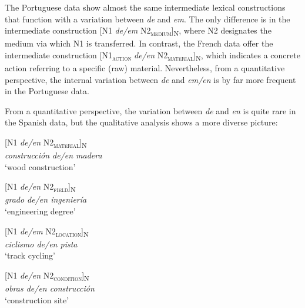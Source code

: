 \documentclass[output=paper]{langsci/langscibook}
\begin{document}
The Portuguese data show almost the same intermediate lexical constructions that function with a variation between \textit{de} and \textit{em}. The only difference is in the intermediate construction [N1 \textit{de/em} N2\textsubscript{\scshape medium}]\textsubscript{N}, where N2 designates the medium via which N1 is transferred. In contrast, the French data offer the intermediate construction [N1\textsubscript{\scshape action} \textit{de/en} N2\textsubscript{\scshape material}]\textsubscript{N}, which indicates a concrete action referring to a specific (raw) material. Nevertheless, from a quantitative perspective, the internal variation between \textit{de} and \textit{em/en} is by far more frequent in the Portuguese data.

From a quantitative perspective, the variation between \textit{de} and \textit{en} is quite rare in the Spanish data, but the qualitative analysis shows a more diverse picture:

\begin{exe}\ex\begin{minipage}[t]{0.4\textwidth}    %
[N1 \textit{de/en} N2\textsubscript{\scshape material}]\textsubscript{N}\\
\textit{construcción de/en madera }\\
`wood construction'
\end{minipage}\hfill%
\begin{minipage}[t]{0.45\textwidth}
[N1 \textit{de/en} N2\textsubscript{\scshape field}]\textsubscript{N}\\
\textit{grado de/en ingeniería}\\
`engineering degree'
\end{minipage}
\end{exe}

\begin{exe}\ex\begin{minipage}[t]{0.4\textwidth}    %
[N1 \textit{de/em} N2\textsubscript{\scshape location}]\textsubscript{N}\\
\textit{ciclismo de/en pista}\\
`track cycling'
\end{minipage}\hfill%
\begin{minipage}[t]{0.45\textwidth}
[N1 \textit{de/en} N2\textsubscript{\scshape condition}]\textsubscript{N}\\
\textit{obras de/en construcción}\\
`construction site'
\end{minipage}\end{exe}
\end{document}
